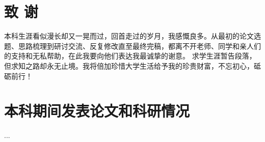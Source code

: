 \documentclass[openany,oneside]{book}
\theoremstyle{definition}
\theoremstyle{definition}
\begin{document}
	

\clearpage
{}
{}

\chapter*{致 \qquad 谢}
\thispagestyle{empty}
本科生涯看似漫长却又一晃而过，回首走过的岁月，我感慨良多。从最初的论文选题、思路梳理到研讨交流、反复修改直至最终完稿，都离不开老师、同学和亲人们的支持和无私帮助，在此我要向他们表达我最诚挚的谢意。
求学生涯暂告段落，但求知之路却永无止境。我将倍加珍惜大学生活给予我的珍贵财富，不忘初心，砥砺前行！
\chapter*{本科期间发表论文和科研情况}
\thispagestyle{empty}

...
\end{document}
